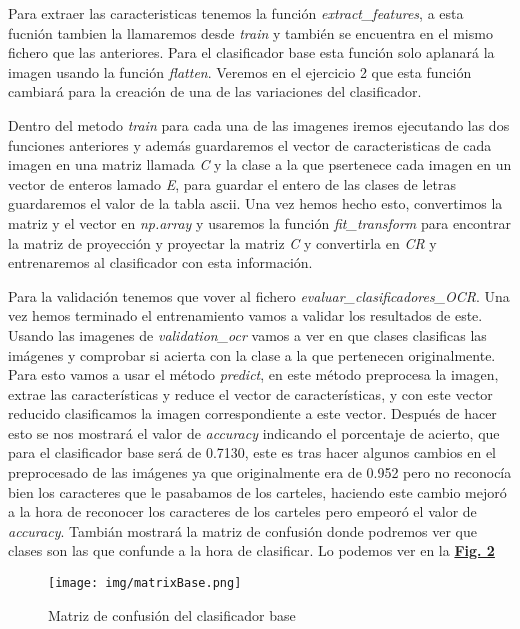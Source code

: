 \documentclass[a4paper, 12pt]{article}
\begin{document}
Para extraer las caracteristicas tenemos la función \textit{extract\_features}, a esta fucnión tambien la llamaremos desde \textit{train} y también se encuentra en el mismo fichero que las anteriores. Para el clasificador base esta función solo aplanará la imagen usando la función \textit{flatten}. Veremos en el ejercicio 2 que esta función cambiará para la creación de una de las variaciones del clasificador.

Dentro del metodo \textit{train} para cada una de las imagenes iremos ejecutando las dos funciones anteriores y además guardaremos el vector de caracteristicas de cada imagen en una matriz llamada \textit{C} y la clase a la que psertenece cada imagen en un vector de enteros lamado \textit{E}, para guardar el entero de las clases de letras guardaremos el valor de la tabla ascii. Una vez hemos hecho esto, convertimos la matriz y el vector en \textit{np.array} y usaremos la función \textit{fit\_transform} para encontrar la matriz de proyección y proyectar la matriz \textit{C} y convertirla en \textit{CR} y entrenaremos al clasificador con esta información. 

Para la validación tenemos que vover al fichero \textit{evaluar\_clasificadores\_OCR}. Una vez hemos terminado el entrenamiento vamos a validar los resultados de este. Usando las imagenes de \textit{validation\_ocr} vamos a ver en que clases clasificas las imágenes y comprobar si acierta con la clase a la que pertenecen originalmente. Para esto vamos a usar el método \textit{predict}, en este método preprocesa la imagen, extrae las características y reduce el vector de características, y con este vector reducido clasificamos la imagen correspondiente a este vector. Después de hacer esto se nos mostrará el valor de \textit{accuracy} indicando el porcentaje de acierto, que para el clasificador base será de 0.7130, este es tras hacer algunos cambios en el preprocesado de las imágenes ya que originalmente era de 0.952 pero no reconocía bien los caracteres que le pasabamos de los carteles, haciendo este cambio mejoró a la hora de reconocer los caracteres de los carteles pero empeoró el valor de \textit{accuracy}. Tambián mostrará la matriz de confusión donde podremos ver que clases son las que confunde a la hora de clasificar. 
Lo podemos ver en la \textbf{\hyperref[fig:normalizacion]{Fig. 2}}

\begin{figure}[h]
	\centering
	\texttt{[image: img/matrixBase.png]}
 	\caption{Matriz de confusión del clasificador base}\vspace{0.5cm}
	\label{fig:normalizacion}
\end{figure}
\end{document}
